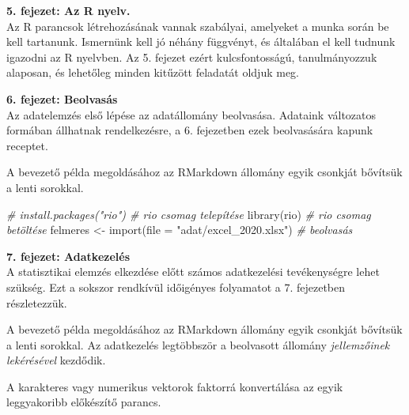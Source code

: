 \documentclass[
]{book}
\newenvironment{Shaded}{\begin{snugshade}}{\end{snugshade}}
\newcommand{\AttributeTok}[1]{\textcolor[rgb]{0.77,0.63,0.00}{#1}}
\newcommand{\CommentTok}[1]{\textcolor[rgb]{0.56,0.35,0.01}{\textit{#1}}}
\newcommand{\FunctionTok}[1]{\textcolor[rgb]{0.00,0.00,0.00}{#1}}
\newcommand{\NormalTok}[1]{#1}
\newcommand{\OtherTok}[1]{\textcolor[rgb]{0.56,0.35,0.01}{#1}}
\newcommand{\SpecialCharTok}[1]{\textcolor[rgb]{0.00,0.00,0.00}{#1}}
\newcommand{\StringTok}[1]{\textcolor[rgb]{0.31,0.60,0.02}{#1}}
\begin{document}
\textbf{5. fejezet: Az R nyelv.}\\
Az R parancsok létrehozásának vannak szabályai, amelyeket a munka során be kell tartanunk. Ismernünk kell jó néhány függvényt, és általában el kell tudnunk igazodni az R nyelvben. Az 5. fejezet ezért kulcsfontosságú, tanulmányozzuk alaposan, és lehetőleg minden kitűzött feladatát oldjuk meg.

\textbf{6. fejezet: Beolvasás}\\
Az adatelemzés első lépése az adatállomány beolvasása. Adataink változatos formában állhatnak rendelkezésre, a 6. fejezetben ezek beolvasására kapunk receptet.

A bevezető példa megoldásához az RMarkdown állomány egyik csonkját bővítsük a lenti sorokkal.

\begin{Shaded}
\begin{Highlighting}[]
\CommentTok{\# install.packages("rio")                         \# rio csomag telepítése}
\FunctionTok{library}\NormalTok{(rio)                                      }\CommentTok{\# rio csomag betöltése}
\NormalTok{felmeres }\OtherTok{\textless{}{-}} \FunctionTok{import}\NormalTok{(}\AttributeTok{file =} \StringTok{"adat/excel\_2020.xlsx"}\NormalTok{) }\CommentTok{\# beolvasás}
\end{Highlighting}
\end{Shaded}

\textbf{7. fejezet: Adatkezelés}\\
A statisztikai elemzés elkezdése előtt számos adatkezelési tevékenységre lehet szükség. Ezt a sokszor rendkívül időigényes folyamatot a 7. fejezetben részletezzük.

A bevezető példa megoldásához az RMarkdown állomány egyik csonkját bővítsük a lenti sorokkal. Az adatkezelés legtöbbször a beolvasott állomány \emph{jellemzőinek lekérésével} kezdődik.

\begin{Shaded}
\end{Shaded}

A karakteres vagy numerikus vektorok faktorrá konvertálása az egyik leggyakoribb előkészítő parancs.
\end{document}
